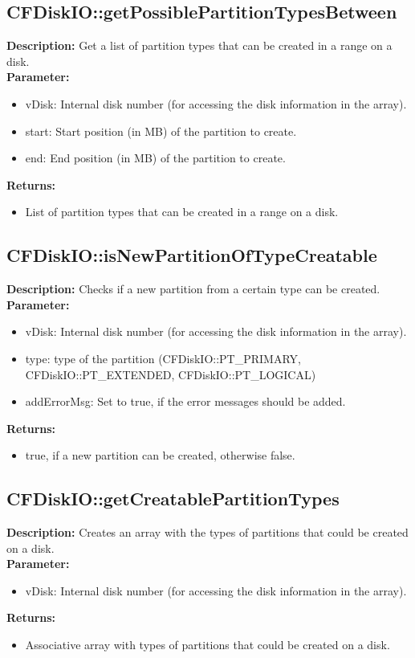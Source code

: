 \subsection{CFDiskIO::getPossiblePartitionTypesBetween}
\textbf{Description:} Get a list of partition types that can be created in a range on a disk.\\
\textbf{Parameter:}
\begin{itemize}
\item vDisk: Internal disk number (for accessing the disk information in the array).
\item start: Start position (in MB) of the partition to create.
\item end: End position (in MB) of the partition to create.
\end{itemize}
\textbf{Returns:}
\begin{itemize}
\item List of partition types that can be created in a range on a disk.
\end{itemize}

\subsection{CFDiskIO::isNewPartitionOfTypeCreatable}
\textbf{Description:} Checks if a new partition from a certain type can be created.\\
\textbf{Parameter:}
\begin{itemize}
\item vDisk: Internal disk number (for accessing the disk information in the array).
\item type: type of the partition (CFDiskIO::PT\_PRIMARY, CFDiskIO::PT\_EXTENDED, CFDiskIO::PT\_LOGICAL)
\item addErrorMsg: Set to true, if the error messages should be added.
\end{itemize}
\textbf{Returns:}
\begin{itemize}
\item true, if a new partition can be created, otherwise false.
\end{itemize}

\subsection{CFDiskIO::getCreatablePartitionTypes}
\textbf{Description:} Creates an array with the types of partitions that could be created on a disk.\\
\textbf{Parameter:}
\begin{itemize}
\item vDisk: Internal disk number (for accessing the disk information in the array).
\end{itemize}
\textbf{Returns:}
\begin{itemize}
\item Associative array with types of partitions that could be created on a disk.
\end{itemize}

